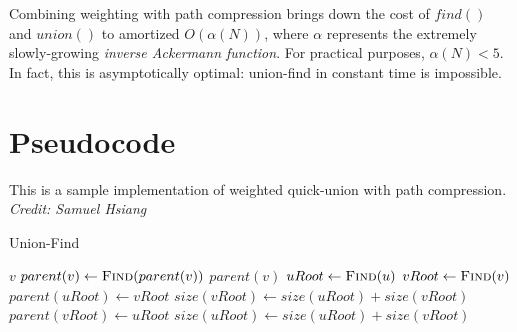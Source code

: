\documentclass{article}
\begin{document}
Combining weighting with path compression brings down the cost of $find()$ and $union()$ to amortized $O(\alpha(N))$, where $\alpha$ represents the extremely slowly-growing \textit{inverse Ackermann function}. For practical purposes, $\alpha(N)<5$. In fact, this is asymptotically optimal: union-find in constant time is impossible.


\section{Pseudocode}

This is a sample implementation of weighted quick-union with path compression. \textit{Credit: Samuel Hsiang}


\begin{algorithm}[H]
\caption{Union-Find}
\begin{algorithmic}
		\State \Return $v$
    \EndIf
    \State $parent(v) \gets \Call{Find}{parent(v)}$
    \State \Return $parent(v)$
\EndFunction
{}
	\State $uRoot \gets \Call{Find}{u}$
	\State $vRoot \gets \Call{Find}{v}$
		\State \Return
	\EndIf
    	\State $parent(uRoot) \gets vRoot$
        \State $size(vRoot) \gets size(uRoot) + size(vRoot)$
    \Else
    	\State $parent(vRoot) \gets uRoot$
        \State $size(uRoot) \gets size(uRoot) + size(vRoot)$
    \EndIf
\EndFunction
\end{algorithmic}
\end{algorithm}
\end{document}

